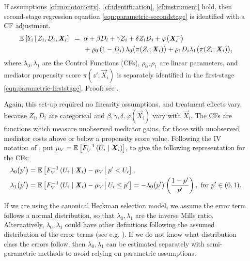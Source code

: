 \begin{proposition}
    \label{proposition:secondstage}
    If assumptions \ref{cf:monotonicity}, \ref{cf:identification}, \ref{cf:instrument} hold, then second-stage regression equation \eqref{eqn:parametric-secondstage} is identified with a CF adjustment.
    \begin{align*}
        \mathbb{E}_{} \left[ Y_i \, \middle\vert \, Z_i, D_i, \boldsymbol{\mathit{X}}_i \right] \;\; =& \;\;
            \alpha
            + \beta D_i
            + \gamma Z_i
            + \delta Z_i D_i
            + \varphi\big(\boldsymbol{\mathit{X}}_i^-\big) \\
            & \;\; +  \rho_0 \left( 1 - D_i \right) \lambda_0 \big( \pi(Z_i ; \boldsymbol{\mathit{X}}_i) \big)
                + \rho_1 D_i \lambda_1 \big( \pi(Z_i ; \boldsymbol{\mathit{X}}_i) \big),
            \label{eqn:cf-secondstage}
    \end{align*}
    where $\lambda_0, \lambda_1$ are the Control Functions (CFs), $\rho_0, \rho_1$ are linear parameters, and mediator propensity score $\pi(z';\vec X_i)$ is separately identified in the first-stage \eqref{eqn:parametric-firststage}.
    Proof: see .
\end{proposition}
Again, this set-up required no linearity assumptions, and treatment effects vary, because $Z_i, D_i$ are categorical and  $\beta, \gamma, \delta , \varphi(\vec X_i)$ vary with $\vec X_i$.
The CFs are functions which measure unobserved mediator gains, for those with unobserved mediator costs above or below a propensity score value.
Following the IV notation of \cite{kline2019heckits}, put $\mu_V = \mathbb{E}_{} \left[ F_V^{-1}\left( U_i \mid \boldsymbol{\mathit{X}}_i \right) \right]$, to give the following representation for the CFs:
\begin{align*}
    \lambda_0\big(p'\big) &=
        \mathbb{E}_{} \left[  F_V^{-1}\left( U_i \mid \boldsymbol{\mathit{X}}_i \right) - \mu_V \, \middle\vert \, p' < U_i \right], \\
    \lambda_1\big(p'\big) &=
        \mathbb{E}_{} \left[  F_V^{-1}\left( U_i \mid \boldsymbol{\mathit{X}}_i \right) - \mu_V \, \middle\vert \, U_i \leq p' \right] = 
            -\lambda_0\big( p' \big) \left(\frac{1-p'}{p'}\right), \text{ for } p' \in (0,1).
\end{align*}

If we are using the canonical Heckman selection model, we assume the error term follows a normal distribution, so that $\lambda_0, \lambda_1$ are the inverse Mills ratio.
Alternatively, $\lambda_0, \lambda_1$ could have other definitions following the assumed distribution of the error terms (see e.g, \citealt{wooldridge2015control}).
If we do not know what distribution class the errors follow, then $\lambda_0, \lambda_1$ can be estimated separately with semi-parametric methods to avoid relying on parametric assumptions.

